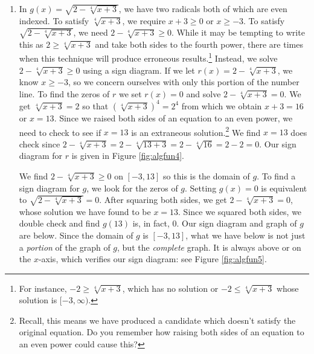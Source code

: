 {\begin{enumerate}
\item In $g(x) = \sqrt{2-\sqrt[4]{x+3}}$, we have two radicals both of which are even indexed.  To satisfy $\sqrt[4]{x+3}$, we require $x+3 \geq 0$ or $x \geq -3$.  To satisfy $ \sqrt{2-\sqrt[4]{x+3}}$, we need $2-\sqrt[4]{x+3} \geq 0$.  While it may be tempting to write this as $2 \geq \sqrt[4]{x+3}$ and take both sides to the fourth power, there are times when this technique will produce erroneous results.\footnote{For instance, $-2 \geq \sqrt[4]{x+3}$, which has no solution or  $-2 \leq \sqrt[4]{x+3}$ whose solution is $[-3,\infty)$.}  Instead, we solve $2-\sqrt[4]{x+3} \geq 0$ using a sign diagram.  If we let $r(x) = 2-\sqrt[4]{x+3}$, we know $x \geq -3$, so we  concern ourselves with only this portion of the number line.  To find the zeros of $r$ we set $r(x) =0$ and solve  $2-\sqrt[4]{x+3}=0$.  We get $\sqrt[4]{x+3} = 2$ so that $\left(\sqrt[4]{x+3}\right)^4 = 2^4$ from which we obtain $x+3 = 16$ or $x=13$.  Since we raised both sides of an equation to an even power, we need to check to see if $x=13$ is an extraneous solution.\footnote{Recall, this means we have produced a candidate which doesn't satisfy the original equation.  Do you remember how raising both sides of an equation to an even power could cause this?}  We find $x=13$ does check since $2-\sqrt[4]{x+3} = 2 - \sqrt[4]{13+3} = 2 - \sqrt[4]{16} = 2 - 2 = 0$. Our sign diagram for $r$ is given in Figure \ref{fig:algfun4}.





We find $2-\sqrt[4]{x+3} \geq 0$ on $[-3,13]$ so this is the domain of $g$.  To find a sign diagram for $g$, we look for the zeros of $g$.  Setting $g(x) = 0$ is equivalent to $\sqrt{2-\sqrt[4]{x+3}}=0$.  After squaring both sides, we get $2-\sqrt[4]{x+3} = 0$, whose solution we have found to be $x=13$.   Since we squared both sides, we double check and find $g(13)$ is, in fact, $0$. Our sign diagram and graph of $g$ are below.  Since the domain of $g$ is $[-3,13]$, what we have below is not just a \textit{portion} of the graph of $g$, but the \textit{complete} graph.  It is always above or on the $x$-axis, which verifies our sign diagram: see Figure \ref{fig:algfun5}.




\end{enumerate}}
